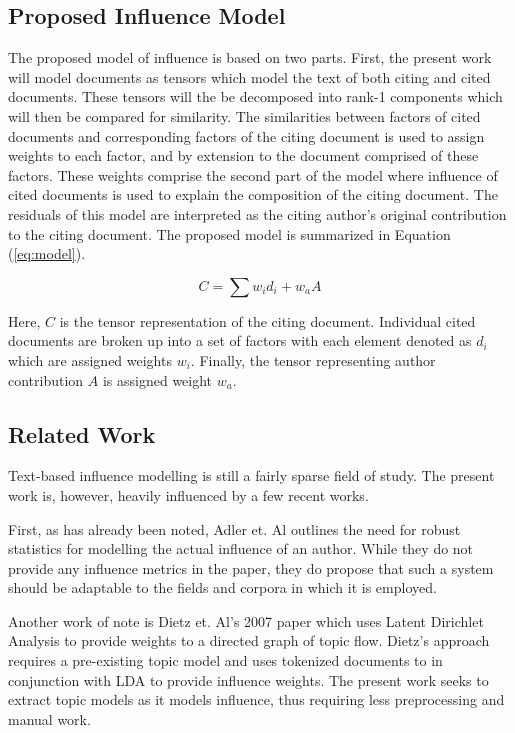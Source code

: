 \documentclass{article}
\begin{document}
\subsection{Proposed Influence Model}
The proposed model of influence is based on two parts.  First, the
present work will model documents as tensors which model the text of
both citing and cited documents. These tensors will the be decomposed
into rank-1 components which will then be compared for similarity.
The similarities between factors of cited documents and corresponding
factors of the citing document is used to assign weights to each
factor, and by extension to the document comprised of these factors.
These weights comprise the second part of the model where influence of
cited documents is used to explain the composition of the citing
document.  The residuals of this model are interpreted as the citing
author's original contribution to the citing document. The proposed
model is summarized in Equation (\ref{eq:model}). 

\begin{equation}
    \label{eq:model}
    C = \sum w_id_i + w_a A
\end{equation}

Here, $C$ is the tensor representation of the citing document.
Individual cited documents are broken up into a set of factors with
each element denoted as $d_i$ which are assigned weights $w_i$.  Finally,
the tensor representing author contribution $A$ is assigned weight
$w_a$.  

\subsection{Related Work}
Text-based influence modelling is still a fairly sparse field of
study.  The present work is, however, heavily influenced by a few
recent works.

First, as has already been noted, Adler et. Al \cite{adler2009}
outlines the need for robust statistics for modelling the actual
influence of an author.  While they do not provide any influence
metrics in the paper, they do propose that such a system should be
adaptable to the fields and corpora in which it is employed.

Another work of note is Dietz et. Al's 2007 paper \cite{dietz2007} which uses
Latent Dirichlet Analysis \cite{blei2003} to provide weights to
a directed graph of topic flow.  Dietz's approach requires
a pre-existing topic model and uses tokenized documents to in
conjunction with LDA to provide influence weights.  The present work
seeks to extract topic models as it models influence, thus requiring
less preprocessing and manual work.
\end{document}
